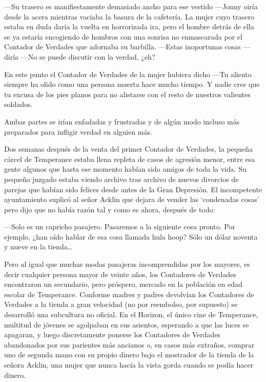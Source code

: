 ---Su trasero es manifiestamente demasiado ancho para ese vestido
---Jonny oiría desde la acera mientras vaciaba la basura de la
cafetería. La mujer cuyo trasero estaba en duda daría la vuelta en
horrorizada ira, pero el hombre detrás de ella se ya estaría encogiendo
de hombros con una sonrisa no enmascarada por el Contador de Verdades
que adornaba su barbilla. ---Estas inoportunas cosas ---diría ---No se
puede discutir con la verdad, ¿eh?

En este punto el Contador de Verdades de la mujer hubiera dicho ---Tu
aliento siempre ha olido como una persona muerta hace mucho tiempo. Y
nadie cree que tu excusa de los pies planos para no alistarse con el
resto de nuestros valientes soldados.

Ambas partes se irían enfadadas y frustradas y de algún modo incluso más
preparados para infligir verdad en alguien más.

Dos semanas después de la venta del primer Contador de Verdades, la
pequeña cárcel de Temperance estaba llena repleta de casos de agresión
menor, entre esa gente algunos que hasta ese momento habían sido amigos
de toda la vida. Su pequeño juzgado estaba viendo archivo tras archivo
de nuevos divorcios de parejas que habían sido felices desde antes de la
Gran Depresión. El incompetente ayuntamiento suplicó al señor Acklin que
dejara de vender las `condenadas cosas' pero dijo que no había razón tal
y como es ahora, después de todo:

---Solo es un capricho pasajero. Pasaremos a la siguiente cosa pronto.
Por ejemplo, ¿han oído hablar de esa cosa llamada hula hoop? Sólo un
dólar noventa y nueve en la tienda\ldots{}

Pero al igual que muchas modas pasajeras incomprendidas por los mayores,
es decir cualquier persona mayor de veinte años, los Contadores de
Verdades encontraron un secundario, pero próspero, mercado en la
población en edad escolar de Temperance. Conforme madres y padres
devolvían los Contadores de Verdades a la tienda a gran velocidad (no
por reembolso, por supuesto) se desarrolló una subcultura no oficial. En
el Horizon, el único cine de Temperance, multitud de jóvenes se
agolpaban en sus asientos, esperando a que las luces se apagaran, y
luego discretamente ponerse los Contadores de Verdades abandonados por
sus parientes más ancianos o, en casos más extraños, comprar uno de
segunda mano con su propio dinero bajo el mostrador de la tienda de la
señora Acklin, una mujer que nunca hacía la vista gorda cuando se podía
hacer dinero.

